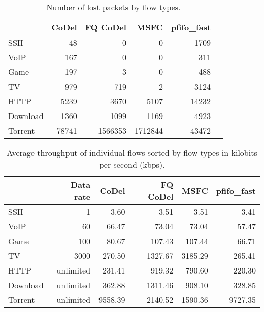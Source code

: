 \begin{table}
	\caption{Number of lost packets by flow types.}
	\label{tab:loss_A}
	\centering
	
	\begin{tabular}{@{}l|rrrrr@{}}
		\toprule
		& {CoDel} & {FQ CoDel} & {MSFC} & {pfifo\_fast}  \\ \midrule
		SSH       &    48         &    0          &    0          &    1709  \\
		VoIP      &    167        &    0          &    0          &    311   \\
		Game      &    197        &    3          &    0          &    488   \\
		TV        &    979        &    719        &    2          &    3124  \\
		HTTP      &    5239       &    3670       &    5107       &    14232 \\
		Download  &    1360       &    1099       &    1169       &    4923  \\
		Torrent   &    78741      &    1566353    &    1712844    &    43472 \\ \bottomrule
	\end{tabular}
\end{table}

\begin{table}
	\caption{Average throughput of individual flows sorted by flow types in kilobits per second (kbps).}
	\label{tab:throughput_A}
	\centering
	
	\begin{tabular}{@{}l|rrrrr@{}}
		\toprule
		         & {Data rate} & {CoDel} & {FQ CoDel} &  {MSFC} & {pfifo\_fast} \\ \midrule
		SSH      &           1 &    3.60 &       3.51 &    3.51 &          3.41 \\
		VoIP     &          60 &   66.47 &      73.04 &   73.04 &         57.47 \\
		Game     &         100 &   80.67 &     107.43 &  107.44 &         66.71 \\
		TV       &        3000 &  270.50 &    1327.67 & 3185.29 &        265.41 \\
		HTTP     &   unlimited &  231.41 &     919.32 &  790.60 &        220.30 \\
		Download &   unlimited &  362.88 &    1311.46 &  908.10 &        328.85 \\
		Torrent  &   unlimited & 9558.39 &    2140.52 & 1590.36 &       9727.35 \\ \bottomrule
	\end{tabular}
\end{table}









